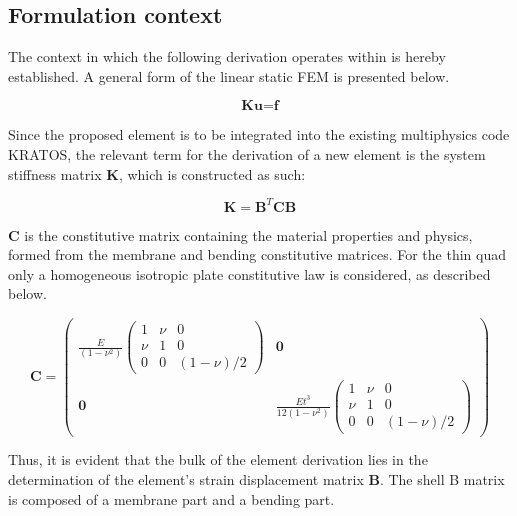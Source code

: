\subsection{Formulation context}

The context in which the following derivation operates within is hereby established. A general form of the linear static FEM is presented below.

\begin{equation} 
\textbf{K} \textbf{u} = \textbf{f}
\label{equation01}
\end{equation}

Since the proposed element is to be integrated into the existing multiphysics code KRATOS, the relevant term for the derivation of a new element is the system stiffness matrix $\textbf{K}$, which is constructed as such:

\begin{equation} 
\textbf{K} = \textbf{B}^T \textbf{C} \textbf{B} 
\label{equation02}
\end{equation}

$\textbf{C}$ is the constitutive matrix containing the material properties and physics, formed from the membrane and bending constitutive matrices. For the thin quad only a homogeneous isotropic plate constitutive law \cite{Bat82} is considered, as described below.

\begin{equation} 
\textbf{C} = 
\begin{pmatrix}
\frac{E}{(1-\nu^2)}
\begin{pmatrix}
1 & \nu & 0 \\
\nu & 1 & 0 \\
0 & 0 & (1-\nu)/2
\end{pmatrix}
& \mathbf{0} \\

\mathbf{0} & \frac{E t^3}{12(1-\nu^2)}
\begin{pmatrix}
1 & \nu & 0 \\
\nu & 1 & 0 \\
0 & 0 & (1-\nu)/2
\end{pmatrix}
\end{pmatrix}
\label{equation03}
\end{equation}

Thus, it is evident that the bulk of the element derivation lies in the determination of the element's strain displacement matrix $\textbf{B}$. The shell B matrix is composed of a membrane part and a bending part.






